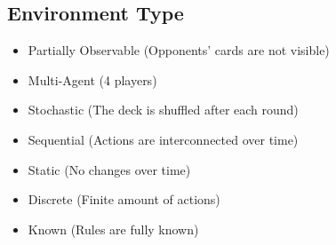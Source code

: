 \subsection{Environment Type}
\begin{itemize}
    \item Partially Observable (Opponents' cards are not visible)
    \item Multi-Agent (4 players)
    \item Stochastic (The deck is shuffled after each round)
    \item Sequential (Actions are interconnected over time)
    \item Static (No changes over time)
    \item Discrete (Finite amount of actions)
    \item Known (Rules are fully known)
\end{itemize}